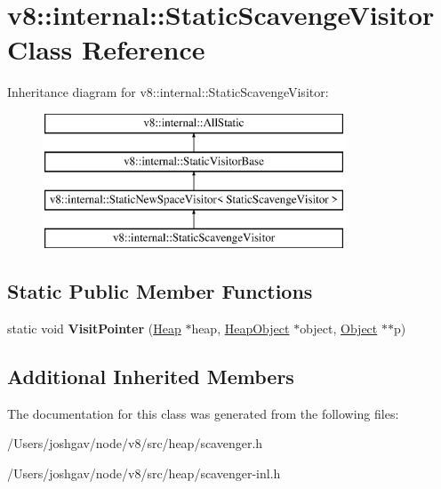 \hypertarget{classv8_1_1internal_1_1_static_scavenge_visitor}{}\section{v8\+:\+:internal\+:\+:Static\+Scavenge\+Visitor Class Reference}
\label{classv8_1_1internal_1_1_static_scavenge_visitor}
Inheritance diagram for v8\+:\+:internal\+:\+:Static\+Scavenge\+Visitor\+:\begin{figure}[H]
\begin{center}
\leavevmode
\includegraphics[height=4.000000cm]{classv8_1_1internal_1_1_static_scavenge_visitor}
\end{center}
\end{figure}
\subsection*{Static Public Member Functions}
\begin{DoxyCompactItemize}
\item 
static void {\bfseries Visit\+Pointer} (\hyperlink{classv8_1_1internal_1_1_heap}{Heap} $\ast$heap, \hyperlink{classv8_1_1internal_1_1_heap_object}{Heap\+Object} $\ast$object, \hyperlink{classv8_1_1internal_1_1_object}{Object} $\ast$$\ast$p)\hypertarget{classv8_1_1internal_1_1_static_scavenge_visitor_a9ee3cd47fc937216ddca5352fd9ac901}{}\label{classv8_1_1internal_1_1_static_scavenge_visitor_a9ee3cd47fc937216ddca5352fd9ac901}

\end{DoxyCompactItemize}
\subsection*{Additional Inherited Members}


The documentation for this class was generated from the following files\+:\begin{DoxyCompactItemize}
\item 
/\+Users/joshgav/node/v8/src/heap/scavenger.\+h\item 
/\+Users/joshgav/node/v8/src/heap/scavenger-\/inl.\+h\end{DoxyCompactItemize}
